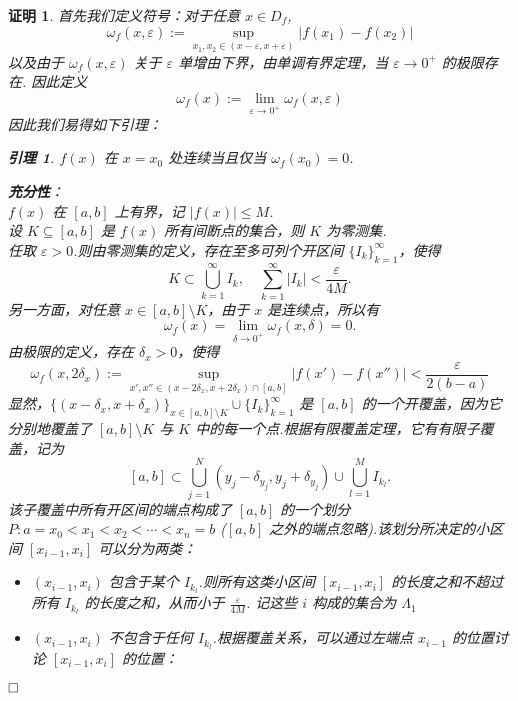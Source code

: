 \documentclass{ctexart}
\newcommand{\。}{．} %
\newenvironment{lanse}{
    \begin{tcolorbox}[enhanced, breakable, colback=qlan, boxrule=0pt, frame hidden,
        borderline west={0.7mm}{0.1mm}{slan}]
    }
    {\end{tcolorbox}}
\newenvironment{huangse}{
    \begin{tcolorbox}[enhanced, breakable, colback=qhuang, boxrule=0pt, frame hidden,
        borderline west={0.7mm}{0.1mm}{shuang}]
    }
    {\end{tcolorbox}}
\theoremstyle{t} %
\newtheorem*{zmhj}{\color{slan} 证明}
\newtheorem{ylhj}{\color{shuang} 引理}[subsection]
\newenvironment{zm}{\begin{lanse}\begin{zmhj}}{$\hfill \square$\end{zmhj}\end{lanse}}
\newenvironment{yl}{\begin{huangse}\begin{ylhj}}{\end{ylhj}\end{huangse}}
\begin{document}
\begin{zm}
    首先我们定义符号：对于任意 $x \in D_f$, 
    \[
        \omega_f(x, \varepsilon) := \sup_{x_1, x_2 \in (x - \varepsilon, x + \varepsilon)}\left\lvert f(x_1) - f(x_2)\right\rvert 
    \]
    以及由于 $\omega_f(x, \varepsilon)$ 关于 $\varepsilon$ 单增由下界，由单调有界定理，当 $\varepsilon \to 0^+$ 的极限存在. 因此定义
    \[
        \omega_f(x) := \lim_{\varepsilon \to 0^+}\omega_f(x, \varepsilon)
    \]
    因此我们易得如下引理：
    \begin{yl}
        $f(x)$ 在 $x = x_0$ 处连续当且仅当 $\omega_f(x_0) = 0$.
    \end{yl}
    \textbf{充分性}： \\
    $f(x)$ 在 $[a, b]$ 上有界，记 $\left\lvert f(x)\right\rvert \leqslant M$.  \\
    设 $K \subseteq [a, b]$ 是 $f(x)$ 所有间断点的集合，则 $K$ 为零测集. \\
    任取 $\varepsilon > 0$.则由零测集的定义，存在至多可列个开区间 $\{I_k\}_{k=1}^{\infty}$，使得
    \[
        K \subset \bigcup_{k=1}^{\infty} I_k, \quad \sum_{k=1}^{\infty} |I_k| < \frac{\varepsilon}{4M}. 
    \]
    另一方面，对任意 $x \in [a, b] \setminus K$，由于 $x$ 是连续点，所以有
    \[ 
        \omega_f(x) = \lim_{\delta \to 0^+} \omega_f(x, \delta) = 0. 
    \] 
    由极限的定义，存在 $\delta_x > 0$，使得
    \[ 
        \omega_f(x, 2\delta_x) := \sup_{x', x'' \in (x-2\delta_x, x+2\delta_x) \cap [a, b]} |f(x') - f(x'')| < \frac{\varepsilon}{2(b-a)}
    \] 
    显然，$\{(x - \delta_x, x + \delta_x)\}_{x \in [a, b] \setminus K} \cup \{I_k\}_{k=1}^{\infty}$ 是 $[a, b]$ 的一个开覆盖，因为它分别地覆盖了 $[a, b] \setminus K$ 与 $K$ 中的每一个点.根据有限覆盖定理，它有有限子覆盖，记为
    $$ [a, b] \subset \bigcup_{j=1}^{N} (y_j - \delta_{y_j}, y_j + \delta_{y_j}) \cup \bigcup_{l=1}^{M} I_{k_l}. $$ 
    该子覆盖中所有开区间的端点构成了 $[a, b]$ 的一个划分 $P : a = x_0 < x_1 < x_2 < \cdots < x_n = b$ ($[a, b]$ 之外的端点忽略).该划分所决定的小区间 $[x_{i-1}, x_i]$ 可以分为两类：
    \begin{itemize}
        \item [\uppercase\expandafter{\romannumeral1}.] $(x_{i-1}, x_i)$ 包含于某个 $I_{k_l}$.则所有这类小区间 $[x_{i-1}, x_i]$ 的长度之和不超过所有 $I_{k_l}$ 的长度之和，从而小于 $\frac{\varepsilon}{4M}$. 记这些 $i$ 构成的集合为 $\Lambda_1$
        \item [\uppercase\expandafter{\romannumeral2}.] $(x_{i-1}, x_i)$ 不包含于任何 $I_{k_l}$.根据覆盖关系，可以通过左端点 $x_{i-1}$ 的位置讨论 $[x_{i-1}, x_i]$ 的位置：

\end{itemize}
\end{zm}
\end{document}
